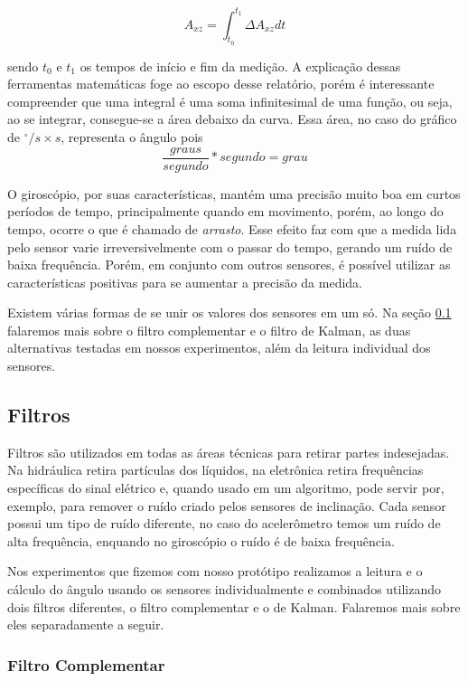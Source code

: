 \documentclass[a4paper,12pt]{article}
\begin{document}
$$A_{xz} = \int_{t_0}^{t_ 1}\Delta A_{xz}dt$$

\noindent\medskip
sendo $t_0$ e $t_1$ os tempos de início e fim da medição. A explicação dessas ferramentas matemáticas foge ao escopo desse relatório, porém é interessante compreender que uma integral é uma soma infinitesimal de uma função, ou seja, ao se integrar, consegue-se a área debaixo da curva. Essa área, no caso do gráfico de $^\circ/s\times s$, representa o ângulo pois $$\frac{graus}{segundo}* segundo=grau$$

O giroscópio, por suas características, mantém uma precisão muito boa em curtos períodos de tempo, principalmente quando em movimento, porém, ao longo do tempo, ocorre o que é chamado de \emph{arrasto}. Esse efeito faz com que a medida lida pelo sensor varie irreversivelmente com o passar do tempo, gerando um ruído de baixa frequência. Porém, em conjunto com outros sensores, é possível utilizar as características positivas para se aumentar a precisão da medida.

Existem várias formas de se unir os valores dos sensores em um só. Na seção \ref{filtros} falaremos mais sobre o filtro complementar e o filtro de Kalman, as duas alternativas testadas em nossos experimentos, além da leitura individual dos sensores.

\subsection{Filtros}
\label{filtros}

Filtros são utilizados em todas as áreas técnicas para retirar partes indesejadas. Na hidráulica retira partículas dos líquidos, na eletrônica retira frequências específicas do sinal elétrico e, quando usado em um algoritmo, pode servir por, exemplo, para remover o ruído criado pelos sensores de inclinação. Cada sensor possui um tipo de ruído diferente, no caso do acelerômetro temos um ruído de alta frequência, enquando no giroscópio o ruído é de baixa frequência.

Nos experimentos que fizemos com nosso protótipo realizamos a leitura e o cálculo do ângulo usando os sensores individualmente e combinados utilizando dois filtros diferentes, o filtro complementar e o de Kalman. Falaremos mais sobre eles separadamente a seguir.

\subsubsection{Filtro Complementar}
\end{document}
